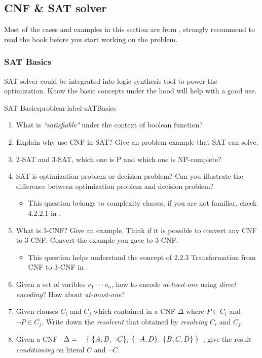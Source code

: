 \documentclass[main.tex]{subfiles}
\begin{document}
\subsection{CNF \& SAT solver}
Most of the cases and examples in this section are from \cite{HandbookOfSAT}, strongly recommend to read the book before you start working on the problem.
\subsubsection{SAT Basics}
SAT solver could be integrated into logic synthesis tool to power the optimization. Know the basic concepts under the hood will help with a good use.
\begin{problem}{SAT Basics}{problem-label-sATBasics}
\begin{enumerate}[(1)]
    \item What is \textit{``satisfiable"} under the context of boolean function?
    \item Explain why use CNF in SAT? Give an problem example that SAT can solve.
    \item 2-SAT and 3-SAT, which one is P and which one is NP-complete?
    \item SAT is optimization problem or decision problem? Can you illustrate the difference between optimization problem and decision problem?
    \begin{itemize}
        \item This question belongs to complexity classes, if you are not familiar, check 4.2.2.1 in \cite{EDA2009}.
    \end{itemize}
    \item What is 3-CNF? Give an example. Think if it is possible to convert any CNF to 3-CNF. Convert the example you gave to 3-CNF.
    \begin{itemize}
        \item This question helps understand the concept of 2.2.3 Transformation from CNF to 3-CNF in \cite{HandbookOfSAT}.
    \end{itemize}
    \item Given a set of varibles $ v_{1}\cdot\cdot\cdot v_{n} $, how to encode \textit{at-least-one} using \textit{direct encoding}? How about \textit{at-most-one}?
    \item Given clauses $C_{i}$ and $C_{j}$ which contained in a CNF $\Delta$ where $P \in C_{i}$ and $\lnot P \in C_{j}$. Write down the \textit{resolvent} that obtained by \textit{resolving} $C_{i}$ and $C_{j}$.
    \item Given a CNF $\begin{array}{r l}{\Delta={}}&{{}\{\;\{A,B,\lnot C\},\;\{\lnot A,D\},\;\{B,C,D\}\;\}}\end{array}$, give the result \textit{conditioning} on literal $C$ and $\lnot C$.
\end{enumerate}
\end{problem}
\vspace*{4\baselineskip}
\end{document}
